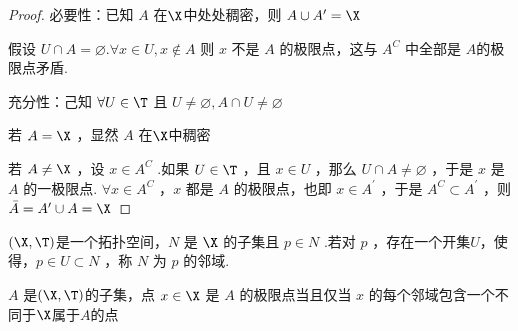 \begin{proof}
	必要性：已知 $A$ 在$\X$中处处稠密，则 $A \cup A^{\prime}=\X$
	
	假设 $U \cap A=\varnothing . \forall x \in U, x \notin A$ 则 $x$ 不是 $A$ 的极限点，这与 $A^C$ 中全部是 $A$的极限点矛盾.
	
	充分性：己知 $\forall U \in\T$ 且 $U \neq \varnothing, A \cap U \neq \varnothing$
	
	若 $A=\X$ ，显然 $A$ 在$\X$中稠密
	
	若 $A \neq \X$ ，设 $x \in A^C$ .如果 $U \in \T$ ，且 $x \in U$ ，那么 $U \cap A \neq \varnothing$ ，于是 $x$ 是 $A$ 的一极限点. $\forall x \in A^C$ ，$x$ 都是 $A$ 的极限点，也即 $x \in A^{\prime}$ ，于是 $A^C \subset A^{\prime}$ ，则 $\bar{A}=A^{\prime} \cup A=\X$
	
\end{proof}
\begin{definition}
	$(\X,\T)$是一个拓扑空间，$N$ 是 $
	\X$ 的子集且 $p \in N$ .若对 $p$ ，存在一个开集$U$，使得，$p \in U \subset N$ ，称 $N$ 为 $p$ 的邻域.
\end{definition}
\begin{proposition}
	$A$ 是$(\X,\T)$的子集，点 $x \in \X$ 是 $A$ 的极限点当且仅当 $x$ 的每个邻域包含一个不同于$\X$属于$A$的点
	
\end{proposition}

